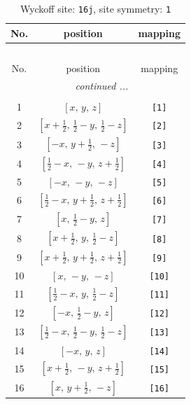 \documentclass[fleqn,8pt]{jsarticle}
\begin{document}
\begin{longtable}{ccc}
\caption{Wyckoff site: {\tt 16j}, site symmetry: {\tt 1}}
 \\
 \hline \hline
No. & position & mapping \\ \hline \endfirsthead

\multicolumn{2}{l}{\tablename\ \thetable{}} \\
 \hline \hline
No. & position & mapping \\ \hline \endhead

 \hline \hline
\multicolumn{2}{r}{\footnotesize\it continued ...} \\ \endfoot

 \hline \hline
\multicolumn{2}{r}{} \\ \endlastfoot

1 & $\left[ x,\, y,\, z \right]$ & {\tt [1]} \\ \hline
2 & $\left[ x + \frac{1}{2},\, \frac{1}{2} - y,\, \frac{1}{2} - z \right]$ & {\tt [2]} \\ \hline
3 & $\left[ - x,\, y + \frac{1}{2},\, - z \right]$ & {\tt [3]} \\ \hline
4 & $\left[ \frac{1}{2} - x,\, - y,\, z + \frac{1}{2} \right]$ & {\tt [4]} \\ \hline
5 & $\left[ - x,\, - y,\, - z \right]$ & {\tt [5]} \\ \hline
6 & $\left[ \frac{1}{2} - x,\, y + \frac{1}{2},\, z + \frac{1}{2} \right]$ & {\tt [6]} \\ \hline
7 & $\left[ x,\, \frac{1}{2} - y,\, z \right]$ & {\tt [7]} \\ \hline
8 & $\left[ x + \frac{1}{2},\, y,\, \frac{1}{2} - z \right]$ & {\tt [8]} \\ \hline
9 & $\left[ x + \frac{1}{2},\, y + \frac{1}{2},\, z + \frac{1}{2} \right]$ & {\tt [9]} \\ \hline
10 & $\left[ x,\, - y,\, - z \right]$ & {\tt [10]} \\ \hline
11 & $\left[ \frac{1}{2} - x,\, y,\, \frac{1}{2} - z \right]$ & {\tt [11]} \\ \hline
12 & $\left[ - x,\, \frac{1}{2} - y,\, z \right]$ & {\tt [12]} \\ \hline
13 & $\left[ \frac{1}{2} - x,\, \frac{1}{2} - y,\, \frac{1}{2} - z \right]$ & {\tt [13]} \\ \hline
14 & $\left[ - x,\, y,\, z \right]$ & {\tt [14]} \\ \hline
15 & $\left[ x + \frac{1}{2},\, - y,\, z + \frac{1}{2} \right]$ & {\tt [15]} \\ \hline
16 & $\left[ x,\, y + \frac{1}{2},\, - z \right]$ & {\tt [16]} \\
\end{longtable}
\end{document}
